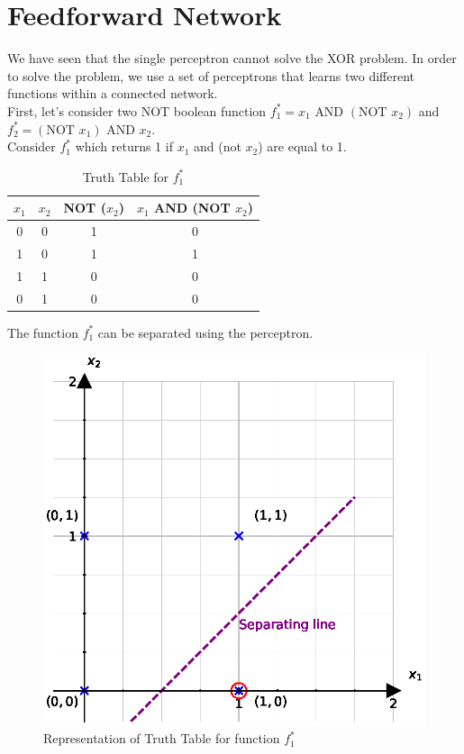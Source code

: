 \section{Feedforward Network}
We have seen that the single perceptron cannot solve the XOR problem. In order to solve the problem, we use a set of perceptrons that learns two different functions within a connected network.\vspace{5mm} \\
First, let's consider two NOT boolean function $f_1^{*} = x_1 \text{ AND } (\text{NOT }x_2)$ and $f_2^{*} = (\text{NOT }x_1) \text{ AND } x_2$. \vspace{5mm}\\
Consider $f_1^{*}$ which returns 1 if $x_1$ and (not $x_2$) are equal to 1.
\begin{table}[H]
  \begin{center}
    \begin{tabular}{ c c c c}
      $x_1$ & $x_2$ & NOT ($x_2$) & $x_1$ AND (NOT $x_2$) \\
     \hline 
      0 & 0 & 1 & 0 \\  
      1 & 0 & 1 & 1 \\  
      1 & 1 & 0 & 0 \\  
      0 & 1 & 0 & 0 
    \end{tabular}
    \caption{Truth Table for $f_1^{*}$}
  \label{table:truth_table_f_1}
  \end{center}  
\end{table} \vspace{5mm}
\noindent The function $f_1^{*}$ can be separated using the perceptron.
\begin{figure}[H]
  \centering
  \includegraphics[scale=0.75]{CHAPTER_2/c2_fig_f_1_XOR_python.eps}
  \caption{Representation of Truth Table for function $f_1^{*}$}
  \label{fig:f1_XOR}
\end{figure}
